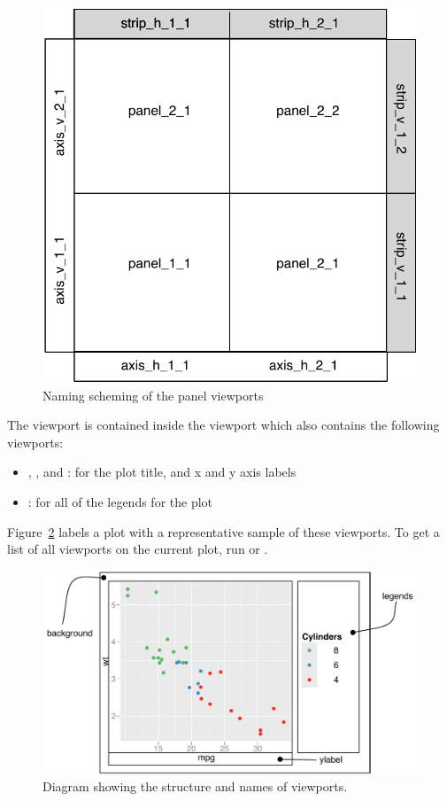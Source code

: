 \begin{figure}[htbp]
  \centering
    \includegraphics[width=0.5 \linewidth]{grid-panelvp}
  \caption{Naming scheming of the panel viewports}
  \label{fig:panelvp}
\end{figure}

The  viewport is contained inside the  viewport which also contains the following viewports:

\begin{itemize}
  \item {}, , and : for the plot title, and x and y axis labels
  \item {}: for all of the legends for the plot
\end{itemize}

\noindent Figure~\ref{fig:viewports} labels a plot with a representative sample of these viewports.  To get a list of all viewports on the current plot, run  or .

\begin{figure}[htbp]
  \centering
    \includegraphics[width=\linewidth]{grid-viewports}
  \caption{Diagram showing the structure and names of viewports.}
  \label{fig:viewports}
\end{figure}


